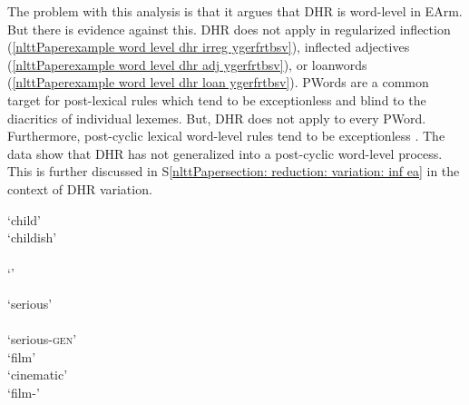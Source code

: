 The problem with this analysis is that it argues that DHR is word-level in EArm. But there is evidence against this. DHR does not apply in regularized inflection (\ref{nlttPaperexample word level dhr irreg ygerfrtbsv}), inflected adjectives (\ref{nlttPaperexample word level dhr adj ygerfrtbsv}), or loanwords (\ref{nlttPaperexample word level dhr loan ygerfrtbsv}). PWords are a common target for post-lexical rules which tend to be exceptionless and blind to the diacritics of individual lexemes. But, DHR does not apply to every PWord. Furthermore, post-cyclic lexical word-level rules tend to be exceptionless \citep{Pesetsky-1979-RussianMorphoLexicalTheory}. The data show that DHR has not generalized into a post-cyclic word-level process. This is further discussed in S\ref{nlttPapersection: reduction: variation: inf ea} in the context of DHR variation. 


\begin{exe}
	\ex 
	\begin{multicols}{3}
		\begin{xlist}
			\ex {}`child'\label{nlttPaperexample word level dhr irreg ygerfrtbsv}\\
			`childish'\\
			\\
			`'
			
			\ex {}`serious'\label{nlttPaperexample word level dhr adj ygerfrtbsv}\\
			\\
			`serious-\textsc{gen}' \\
			
			
			\ex {}`film'\label{nlttPaperexample word level dhr loan ygerfrtbsv}\\
			`cinematic'\\
			`film-{\pl}' 
		\end{xlist}
		
	\end{multicols}
	
\end{exe}

